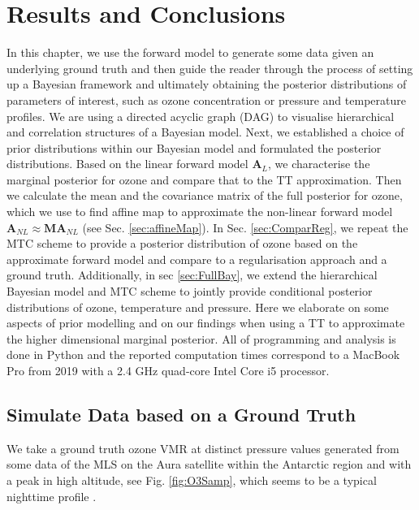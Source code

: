 \chapter{Results and Conclusions}
\label{ch:res}
In this chapter, we use the forward model to generate some data given an underlying ground truth and then guide the reader through the process of setting up a Bayesian framework and ultimately obtaining the posterior distributions of parameters of interest, such as ozone concentration or pressure and temperature profiles.
We are using a directed acyclic graph (DAG) to visualise hierarchical and correlation structures of a Bayesian model.
Next, we established a choice of prior distributions within our Bayesian model and formulated the posterior distributions.
Based on the linear forward model $\bm{A}_L$, we characterise the marginal posterior for ozone and compare that to the TT approximation.
Then we calculate the mean and the covariance matrix of the full posterior for ozone, which we use to find affine map to approximate the non-linear forward model $\bm{A}_{NL} \approx \bm{M} \bm{A}_{NL}$ (see Sec. \ref{sec:affineMap}).
In Sec. \ref{sec:ComparReg}, we repeat the MTC scheme to provide a posterior distribution of ozone based on the approximate forward model and compare to a regularisation approach and a ground truth.
Additionally, in sec \ref{sec:FullBay}, we extend the hierarchical Bayesian model and MTC scheme to jointly provide conditional posterior distributions of ozone, temperature and pressure.
Here we elaborate on some aspects of prior modelling and on our findings when using a TT to approximate the higher dimensional marginal posterior.
All of programming and analysis is done in Python and the reported computation times correspond to a MacBook Pro from 2019 with a 2.4 GHz quad-core Intel Core i5 processor.
\clearpage
\section{Simulate Data based on a Ground Truth}
We take a ground truth ozone VMR at distinct pressure values generated from some data \cite{MLSdata} of the MLS on the Aura satellite within the Antarctic region and with a peak in high altitude, see Fig. \ref{fig:O3Samp}, which seems to be a typical nighttime profile \cite{Lee2020NightOzone}.

